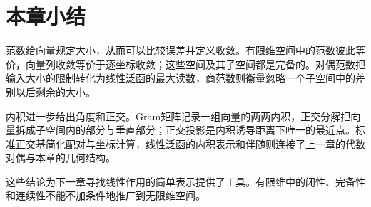 \section{本章小结}
\label{sec:ls-normed-inner-product-summary}

范数给向量规定大小，从而可以比较误差并定义收敛。有限维空间中的范数彼此等价，向量列收敛等价于逐坐标收敛；这些空间及其子空间都是完备的。对偶范数把输入大小的限制转化为线性泛函的最大读数，商范数则衡量忽略一个子空间中的差别以后剩余的大小。

内积进一步给出角度和正交。Gram矩阵记录一组向量的两两内积，正交分解把向量拆成子空间内的部分与垂直部分；正交投影是内积诱导距离下唯一的最近点。标准正交基简化配对与坐标计算，线性泛函的内积表示和伴随则连接了上一章的代数对偶与本章的几何结构。

这些结论为下一章寻找线性作用的简单表示提供了工具。有限维中的闭性、完备性和连续性不能不加条件地推广到无限维空间。
